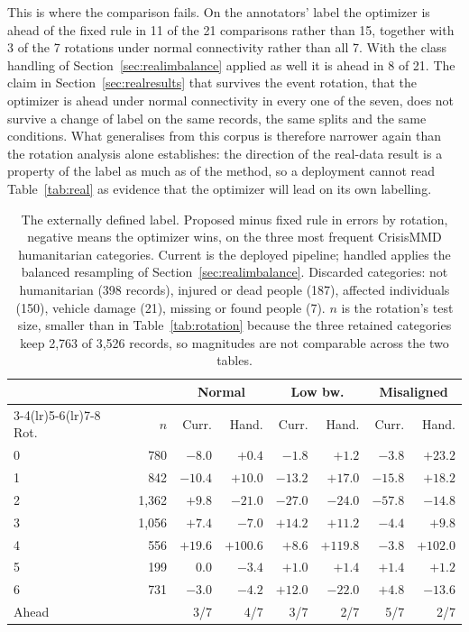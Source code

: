 \documentclass[conference,a4paper]{IEEEtran}
\newif\ifsubmission
\newcommand{\masteronly}[1]{\ifsubmission\else#1\fi}
\begin{document}
This is where the comparison fails. On the annotators' label the optimizer is ahead of the
fixed rule in 11 of the 21 comparisons rather than 15, together with 3 of the 7 rotations under
normal connectivity rather than all 7. With the class handling of
Section~\ref{sec:realimbalance} applied as well it is ahead in 8 of 21. The claim in
Section~\ref{sec:realresults} that survives the event rotation, that the optimizer is
ahead under normal connectivity in every one of the seven, does not survive a change of
label on the same records, the same splits and the same conditions. What generalises from
this corpus is therefore narrower again than the rotation analysis alone establishes: the
direction of the real-data result is a property of the label as much as of the method, so a deployment cannot read Table~\ref{tab:real} as evidence that the optimizer will lead on
its own labelling.

\masteronly{%
\begin{table}[t]
\caption{The externally defined label. Proposed minus fixed rule in errors by rotation,
negative means the optimizer wins, on the three most frequent CrisisMMD humanitarian
categories. Current is the deployed pipeline; handled applies the balanced resampling of
Section~\ref{sec:realimbalance}. Discarded categories: not humanitarian (398 records),
injured or dead people (187), affected individuals (150), vehicle damage (21), missing or
found people (7). $n$ is the rotation's test size, smaller than in Table~\ref{tab:rotation} because the three retained categories keep 2,763 of 3,526 records, so magnitudes are not comparable across the two tables.}
\label{tab:extlabel}
\centering\footnotesize\setlength{\tabcolsep}{4.5pt}
\begin{tabular}{@{}lrrrrrrr@{}}
\toprule
& & \multicolumn{2}{c}{Normal} & \multicolumn{2}{c}{Low bw.} & \multicolumn{2}{c}{Misaligned} \\
\cmidrule(lr){3-4}\cmidrule(lr){5-6}\cmidrule(lr){7-8}
Rot. & $n$ & Curr. & Hand. & Curr. & Hand. & Curr. & Hand. \\
\midrule
0 & 780 & $-8.0$ & $+0.4$ & $-1.8$ & $+1.2$ & $-3.8$ & $+23.2$ \\
1 & 842 & $-10.4$ & $+10.0$ & $-13.2$ & $+17.0$ & $-15.8$ & $+18.2$ \\
2 & 1,362 & $+9.8$ & $-21.0$ & $-27.0$ & $-24.0$ & $-57.8$ & $-14.8$ \\
3 & 1,056 & $+7.4$ & $-7.0$ & $+14.2$ & $+11.2$ & $-4.4$ & $+9.8$ \\
4 & 556 & $+19.6$ & $+100.6$ & $+8.6$ & $+119.8$ & $-3.8$ & $+102.0$ \\
5 & 199 & $0.0$ & $-3.4$ & $+1.0$ & $+1.4$ & $+1.4$ & $+1.2$ \\
6 & 731 & $-3.0$ & $-4.2$ & $+12.0$ & $-22.0$ & $+4.8$ & $-13.6$ \\
\midrule
Ahead & & 3/7 & 4/7 & 3/7 & 2/7 & 5/7 & 2/7 \\
\bottomrule
\end{tabular}
\end{table}}%
\end{document}

